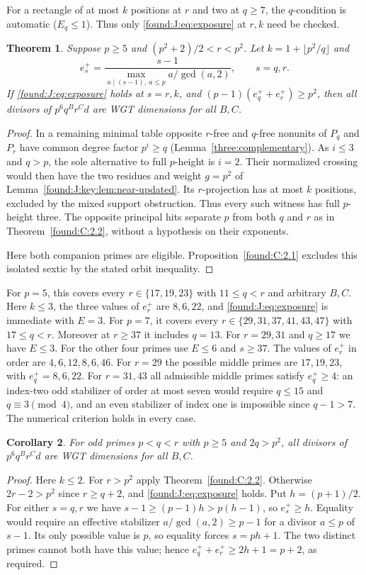 \documentclass[11pt,a4paper]{article}
\numberwithin{equation}{section}
\newtheorem{theorem}{Theorem}[section]
\newtheorem{corollary}[theorem]{Corollary}
\theoremstyle{remark}
\begin{document}
For a rectangle of at most $k$ positions at $r$ and two at $q\ge7$,
the $q$-condition is automatic ($E_q\le1$). Thus only
\eqref{found:J:eq:exposure} at $r,k$ need be checked.
\begin{theorem}\label{found:J:2.2}\label{found:J:key:thm:below-square}
Suppose $p\ge5$ and $(p^2+2)/2<r<p^2$. Let
$k=1+\lfloor p^2/q\rfloor$ and
\[
 e_s^+=\frac{s-1}{\max_{a\mid(s-1),\ a\le p} a/\gcd(a,2)},\qquad s=q,r.
\]
If \eqref{found:J:eq:exposure} holds at $s=r,k$, and
$(p-1)(e_q^++e_r^+)\ge p^2$, then all divisors of
$p^6 q^B r^C d$ are WGT dimensions for all $B,C$.
\end{theorem}
\begin{proof}
In a remaining minimal table opposite $r$-free and $q$-free
nonunits of $P_q$ and $P_r$ have common degree factor $p^i\ge q$ (Lemma~\ref{three:complementary}). As $i\le3$ and $q>p$, the sole alternative to
full $p$-height is $i=2$. Their normalized crossing would then have
the two residues and weight $g=p^2$ of Lemma~\ref{found:J:key:lem:near-updated}.
Its $r$-projection has at most $k$ positions, excluded by the
mixed support obstruction. Thus every such witness has full $p$-height
three. The opposite principal hits separate $p$ from both $q$ and $r$
as in Theorem~\ref{found:C:2.2}, without a hypothesis on their exponents.

Here both companion primes are eligible. Proposition~\ref{found:C:2.1}
excludes this isolated sextic by the stated orbit inequality.
\end{proof}

For $p=5$, this covers every $r\in\{17,19,23\}$ with $11\le q<r$
and arbitrary $B,C$. Here $k\le3$, the three values of $e_r^+$
are $8,6,22$, and \eqref{found:J:eq:exposure} is immediate with $E=3$. For $p=7$, it covers
every $r\in\{29,31,37,41,43,47\}$ with $17\le q<r$. Moreover
at $r\ge37$ it includes $q=13$. For $r=29,31$ and $q\ge17$
we have $E\le3$. For the other four primes use $E\le6$ and
$s\ge37$. The values of $e_r^+$ in order are $4,6,12,8,6,46$.
For $r=29$ the possible middle primes are $17,19,23$, with
$e_q^+=8,6,22$. For $r=31,43$ all admissible middle primes satisfy
$e_q^+\ge4$: an index-two odd stabilizer of order at most seven
would require $q\le15$ and $q\equiv3\pmod4$, and an even stabilizer
of index one is impossible since $q-1>7$. The numerical criterion
holds in every case.

\begin{corollary}\label{found:J:2.3}\label{found:J:key:cor:halfsquare}
For odd primes $p<q<r$ with $p\ge5$ and $2q>p^2$, all divisors of
$p^6q^Br^Cd$ are WGT dimensions for all $B,C$. 
\end{corollary}
\begin{proof}
Here $k\le2$. For $r>p^2$ apply Theorem~\ref{found:C:2.2}. Otherwise
$2r-2>p^2$ since $r\ge q+2$, and \eqref{found:J:eq:exposure} holds. Put $h=(p+1)/2$.
For either $s=q,r$ we have $s-1\ge(p-1)h>p(h-1)$, so $e_s^+\ge h$.
Equality would require an effective stabilizer $a/\gcd(a,2)\ge p-1$
for a divisor $a\le p$ of $s-1$. Its only possible value is $p$,
so equality forces $s=ph+1$. The two distinct primes cannot both
have this value; hence $e_q^++e_r^+\ge2h+1=p+2$, as required.
\end{proof}
\end{document}
